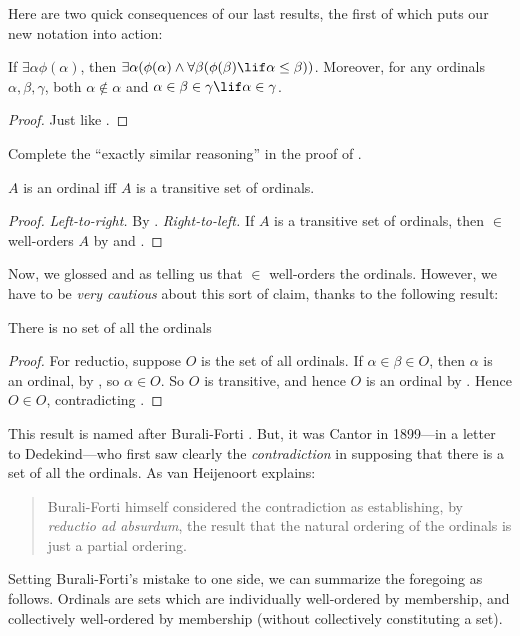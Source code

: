 \documentclass[../../../include/open-logic-section]{subfiles}
\begin{document}
Here are two quick consequences of our last results, the first of
which puts our new notation into action:

\begin{cor}
If $\exists \alpha\phi(\alpha)$, then $\exists \alpha(\phi(\alpha)
\land \forall \beta(\phi(\beta) \lif \alpha \leq \beta))$.
Moreover, for any ordinals $\alpha, \beta, \gamma$, both $\alpha
\notin \alpha$ and $\alpha \in \beta \in \gamma \lif \alpha \in
\gamma$. 
\end{cor}

\begin{proof}
Just like .
\end{proof}

\begin{prob}
Complete the ``exactly similar reasoning'' in the proof of
.
\end{prob}

\begin{cor}
$A$ is an ordinal iff $A$ is a transitive set of ordinals.
\end{cor}

\begin{proof}
\emph{Left-to-right.} By . \emph{Right-to-left.}
If $A$ is a transitive set of ordinals, then $\in$ well-orders $A$ by
 and .
\end{proof}

Now, we glossed 
 and  as telling us that $\in$ well-orders the ordinals. However, we 
have to be \emph{very cautious} about this sort of claim, thanks to the
following result:

\begin{thm}
There is no set of all the ordinals
\end{thm}

\begin{proof}
For reductio, suppose $O$ is the set of all ordinals. If $\alpha \in
\beta \in O$, then $\alpha$ is an ordinal, by , so
$\alpha \in O$. So $O$ is transitive, and hence $O$ is an ordinal by
. Hence $O \in O$, contradicting
. 
\end{proof}
\noindent
This result is named after Burali-Forti \cite{Burali-Forti1897}. But, it was Cantor in 1899---in a letter to Dedekind---who first saw
clearly the \emph{contradiction} in supposing that there is a set of
all the ordinals. As van
Heijenoort explains:
\begin{quote}
  Burali-Forti himself considered the contradiction as establishing,
  by \emph{reductio ad absurdum}, the result that the natural ordering
  of the ordinals is just a partial ordering.
  \cite[p.~105]{Heijenoort1967}
\end{quote}
Setting Burali-Forti's mistake to one side, we can summarize the foregoing as follows. Ordinals are sets which are individually well-ordered by
membership, and collectively well-ordered by membership (without collectively constituting a set). 
\end{document}
